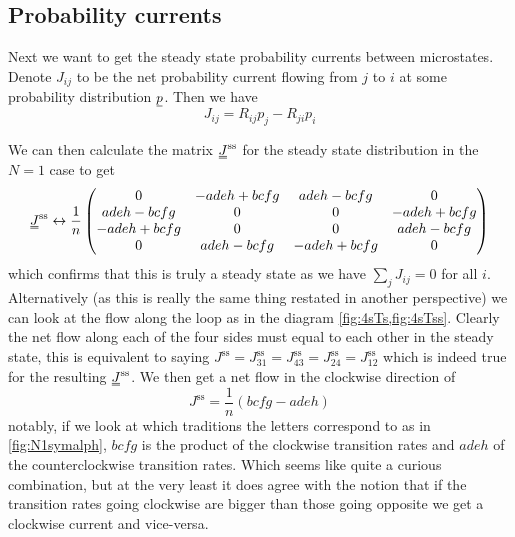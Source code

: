 \documentclass[11pt]{article}
\newcommand{\suf}[2]{\stackunder[0.5pt]{\stackunder[1pt]{\ensuremath{#1}}{\rule{\widthof{\ensuremath{#2}}*\real{0.9}}{.1ex}}}{}}
\newcommand{\duf}[2]{\stackunder[0.5pt]{\stackunder[0.8pt]{\stackunder[1pt]{\ensuremath{#1}}{\rule{\widthof{\ensuremath{#2}}*\real{0.9}}{.1ex}}}{\rule{\widthof{\ensuremath{#2}}*\real{0.9}}{.1ex}}}{}}
\newcommand{\su}[1]{\suf{#1}{#1}}
\newcommand{\du}[1]{\duf{#1}{#1}}
\begin{document}
\subsection{Probability currents}
Next we want to get the steady state probability currents between microstates.
Denote $J_{ij}$ to be the net probability current flowing from $j$ to $i$ at some probability distribution $\su{p}$.
Then we have
\begin{equation}\label{eq:current}
	J_{ij} = R_{ij}p_j-R_{ji}p_i
\end{equation}

We can then calculate the matrix $\du{J}^\text{ss}$ for the steady state distribution in the $N=1$ case to get
\begin{equation}
	\du{J}^\text{ss} \leftrightarrow \frac{1}{n} \begin{pmatrix}
		0                   & - a d e h + b c f g & a d e h - b c f g   & 0                   \\
		a d e h - b c f g   & 0                   & 0                   & - a d e h + b c f g \\
		- a d e h + b c f g & 0                   & 0                   & a d e h - b c f g   \\
		0                   & a d e h - b c f g   & - a d e h + b c f g & 0                   \\
	\end{pmatrix}
\end{equation}
which confirms that this is truly a steady state as we have $\sum_j J_{ij} = 0$ for all $i$.
Alternatively (as this is really the same thing restated in another perspective) we can look at the flow along the loop as in the diagram \cref{fig:4sTs,fig:4sTss}.
Clearly the net flow along each of the four sides must equal to each other in the steady state, this is equivalent to saying $J^\text{ss}=J^\text{ss}_{31}=J^\text{ss}_{43}=J^\text{ss}_{24}=J^\text{ss}_{12}$ which is indeed true for the resulting $\du{J}^\text{ss}$.
We then get a net flow in the clockwise direction of
\begin{equation}
	J^\text{ss}=\frac{1}{n}(bcfg-adeh)
\end{equation}
notably, if we look at which traditions the letters correspond to as in \cref{fig:N1symalph}, $bcfg$ is the product of the clockwise transition rates and $adeh$ of the counterclockwise transition rates.
Which seems like quite a curious combination, but at the very least it does agree with the notion that if the transition rates going clockwise are bigger than those going opposite we get a clockwise current and vice-versa.
\end{document}
